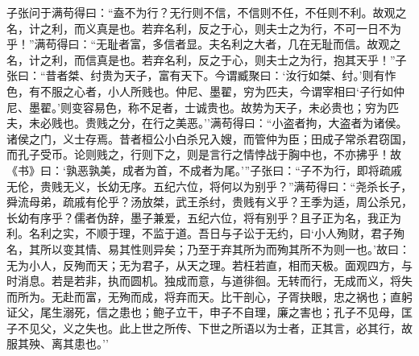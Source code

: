 \documentclass[]{article}
\begin{document}
子张问于满苟得曰：``盍不为行？无行则不信，不信则不任，不任则不利。故观之名，计之利，而义真是也。若弃名利，反之于心，则夫士之为行，不可一日不为乎！''满苟得曰：``无耻者富，多信者显。夫名利之大者，几在无耻而信。故观之名，计之利，而信真是也。若弃名利，反之于心，则夫士之为行，抱其天乎！''子张曰：``昔者桀、纣贵为天子，富有天下。今谓臧聚曰：`汝行如桀、纣。'则有怍色，有不服之心者，小人所贱也。仲尼、墨翟，穷为匹夫，今谓宰相曰`子行如仲尼、墨翟。'则变容易色，称不足者，士诚贵也。故势为天子，未必贵也；穷为匹夫，未必贱也。贵贱之分，在行之美恶。''满苟得曰：``小盗者拘，大盗者为诸侯。诸侯之门，义士存焉。昔者桓公小白杀兄入嫂，而管仲为臣；田成子常杀君窃国，而孔子受币。论则贱之，行则下之，则是言行之情悖战于胸中也，不亦拂乎！故《书》曰：`孰恶孰美，成者为首，不成者为尾。'''子张曰：``子不为行，即将疏戚无伦，贵贱无义，长幼无序。五纪六位，将何以为别乎？''满苟得曰：``尧杀长子，舜流母弟，疏戚有伦乎？汤放桀，武王杀纣，贵贱有义乎？王季为适，周公杀兄，长幼有序乎？儒者伪辞，墨子兼爱，五纪六位，将有别乎？且子正为名，我正为利。名利之实，不顺于理，不监于道。吾日与子讼于无约，曰`小人殉财，君子殉名，其所以变其情、易其性则异矣；乃至于弃其所为而殉其所不为则一也。'故曰：无为小人，反殉而天；无为君子，从天之理。若枉若直，相而天极。面观四方，与时消息。若是若非，执而圆机。独成而意，与道徘徊。无转而行，无成而义，将失而所为。无赴而富，无殉而成，将弃而天。比干剖心，子胥抉眼，忠之祸也；直躬证父，尾生溺死，信之患也；鲍子立干，申子不自理，廉之害也；孔子不见母，匡子不见父，义之失也。此上世之所传、下世之所语以为士者，正其言，必其行，故服其殃、离其患也。''
\end{document}
